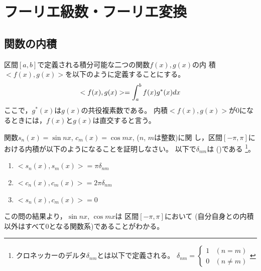 \documentclass[twocolumn,11pt]{jarticle}
\begin{document}
\pagestyle{empty}

\newpage

\rule{0pt}{10cm}
\newpage

\setcounter{page}{1}
\pagestyle{fancy}

\section{フーリエ級数・フーリエ変換}

\subsection{関数の内積}

区間$[a,b]$で定義される積分可能な二つの関数$f(x),g(x)$の内
積$<f(x),g(x)>$を以下のように定義することにする。
\begin{align}
  <f(x),g(x)>=\int_{a}^{b}f(x)g^*(x)dx \notag
\end{align}
ここで，$g^*(x)$は$g(x)$の共役複素数である。
内積$<f(x),g(x)>$が0になるときには，$f(x)$と$g(x)$は直交すると言う。

\question
関数$s_n(x)=\sin nx$, $c_m(x)=\cos mx$, ($n$, $m$は整数)に関
し，区間$[-\pi,\pi]$における内積が以下のようになることを証明しなさい。
以下で$\delta_{nm}$は
()である
\footnote{
クロネッカーのデルタ$\delta_{nm}$とは以下で定義される。
$\delta_{nm}=
\begin{cases}
  1&(n=m)\\
  0 &(n\ne m)
\end{cases}
$
}。
\begin{enumerate}
\item $<s_n(x), s_m(x)>=\pi\delta_{nm}$
\item $<c_n(x), c_m(x)>=2\pi\delta_{nm} $
\item $<s_n(x), c_m(x)>=0$
\end{enumerate}
この問の結果より，$\sin nx$, $\cos mx$は
区間$[-\pi,\pi]$において
(自分自身との内積以外はすべて$0$となる関数系)であることがわかる。
\end{document}
